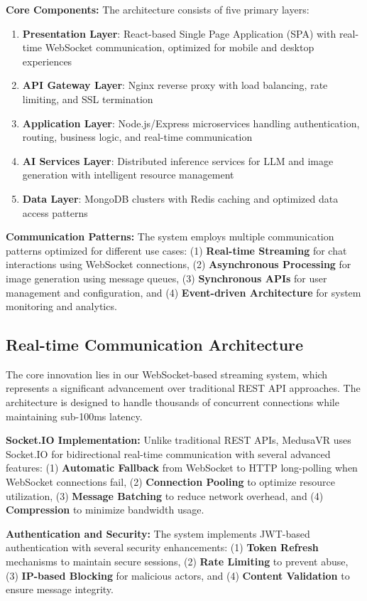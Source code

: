 \documentclass[conference]{IEEEtran}
\begin{document}
\textbf{Core Components:} The architecture consists of five primary layers:

\begin{enumerate}
\item \textbf{Presentation Layer}: React-based Single Page Application (SPA) with real-time WebSocket communication, optimized for mobile and desktop experiences
\item \textbf{API Gateway Layer}: Nginx reverse proxy with load balancing, rate limiting, and SSL termination
\item \textbf{Application Layer}: Node.js/Express microservices handling authentication, routing, business logic, and real-time communication
\item \textbf{AI Services Layer}: Distributed inference services for LLM and image generation with intelligent resource management
\item \textbf{Data Layer}: MongoDB clusters with Redis caching and optimized data access patterns
\end{enumerate}

\textbf{Communication Patterns:} The system employs multiple communication patterns optimized for different use cases: (1) \textbf{Real-time Streaming} for chat interactions using WebSocket connections, (2) \textbf{Asynchronous Processing} for image generation using message queues, (3) \textbf{Synchronous APIs} for user management and configuration, and (4) \textbf{Event-driven Architecture} for system monitoring and analytics.

\subsection{Real-time Communication Architecture}
The core innovation lies in our WebSocket-based streaming system, which represents a significant advancement over traditional REST API approaches. The architecture is designed to handle thousands of concurrent connections while maintaining sub-100ms latency.

\textbf{Socket.IO Implementation:} Unlike traditional REST APIs, MedusaVR uses Socket.IO for bidirectional real-time communication with several advanced features: (1) \textbf{Automatic Fallback} from WebSocket to HTTP long-polling when WebSocket connections fail, (2) \textbf{Connection Pooling} to optimize resource utilization, (3) \textbf{Message Batching} to reduce network overhead, and (4) \textbf{Compression} to minimize bandwidth usage.

\textbf{Authentication and Security:} The system implements JWT-based authentication with several security enhancements: (1) \textbf{Token Refresh} mechanisms to maintain secure sessions, (2) \textbf{Rate Limiting} to prevent abuse, (3) \textbf{IP-based Blocking} for malicious actors, and (4) \textbf{Content Validation} to ensure message integrity.
\end{document}

